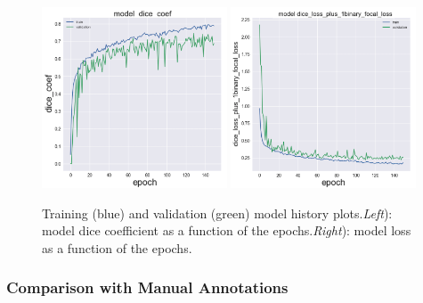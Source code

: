 \documentclass{standalone}
\begin{document}
\begin{figure}[ht]

    \centering
    \includegraphics[width=0.49\textwidth]{../images/dice_coef.png}
	\includegraphics[width=0.49\textwidth]{../images/loss.png}

    \caption{Training (blue) and validation (green) model history plots.\textit{Left}): model dice coefficient as a function of the epochs.\textit{Right}): model loss as a function of the epochs.}
    \label{training}
    
\end{figure}
	
\newpage

\subsubsection{Comparison with Manual Annotations}
\end{document}
